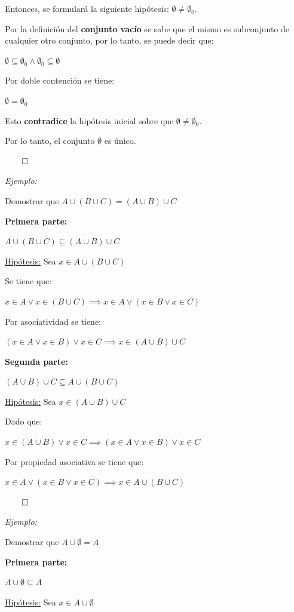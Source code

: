 \documentclass{article}
\begin{document}
Entonces, se formulará la siguiente hipótesis: $\emptyset \neq \emptyset_0$.

Por la definición del \textbf{conjunto vacío} se sabe que el mismo es subconjunto de cualquier otro conjunto, por lo tanto, se puede decir que:

$\emptyset \subseteq \emptyset_0 \land \emptyset_0 \subseteq \emptyset$ 

Por doble contención se tiene: 

$\emptyset = \emptyset_0$

Esto \textbf{contradice} la hipótesis inicial sobre que $\emptyset \neq \emptyset_0$.

Por lo tanto, el conjunto $\emptyset$ es único.

$\qed$

\textit{Ejemplo:}

Demostrar que $A \cup (B \cup C) = (A \cup B) \cup C$

\textbf{Primera parte:} 

$A \cup (B \cup C) \subseteq (A \cup B) \cup C$

\underline{Hipótesis:} Sea $x \in  A \cup (B \cup C)$

Se tiene que:

$x \in A  \lor x \in (B \cup C) \implies x \in A \lor (x \in B \lor x \in C)$ 

Por asociatividad se tiene:

$(x \in A \lor x \in B) \lor x \in C \implies x \in (A \cup B) \cup C$

\textbf{Segunda parte:} 

$(A \cup B) \cup C \subseteq A \cup (B \cup C)$

\underline{Hipótesis:} Sea $x \in (A \cup B) \cup C$

Dado que:

$x \in (A \cup B) \lor x \in C \implies (x \in A \lor x \in B) \lor x \in C$

Por propiedad asociativa se tiene que:

$x \in A \lor (x \in B \lor x \in C) \implies x \in A \cup (B \cup C)$

$\qed$

\newpage
\textit{Ejemplo:}

Demostrar que $A \cup \emptyset = A$

\textbf{Primera parte:} 

$A \cup \emptyset \subseteq A$

\underline{Hipótesis:} Sea $x \in A \cup \emptyset$
\end{document}
